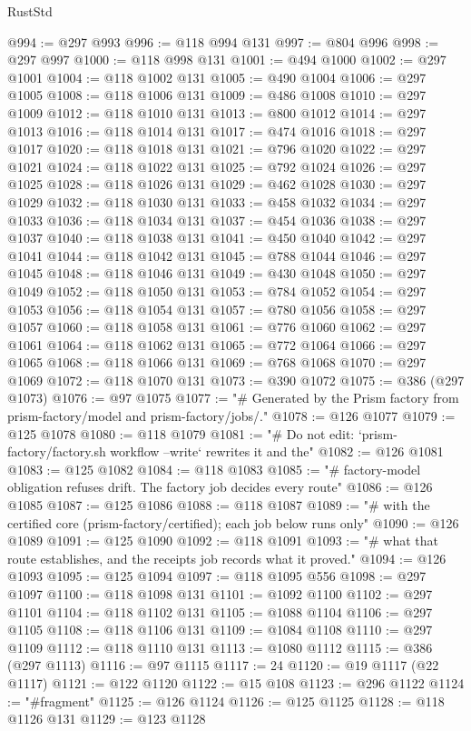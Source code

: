 \begin{lexlean}{RustStd}
\begin{coremodule}
@994 := @297 @993
@996 := @118 @994 @131
@997 := @804 @996
@998 := @297 @997
@1000 := @118 @998 @131
@1001 := @494 @1000
@1002 := @297 @1001
@1004 := @118 @1002 @131
@1005 := @490 @1004
@1006 := @297 @1005
@1008 := @118 @1006 @131
@1009 := @486 @1008
@1010 := @297 @1009
@1012 := @118 @1010 @131
@1013 := @800 @1012
@1014 := @297 @1013
@1016 := @118 @1014 @131
@1017 := @474 @1016
@1018 := @297 @1017
@1020 := @118 @1018 @131
@1021 := @796 @1020
@1022 := @297 @1021
@1024 := @118 @1022 @131
@1025 := @792 @1024
@1026 := @297 @1025
@1028 := @118 @1026 @131
@1029 := @462 @1028
@1030 := @297 @1029
@1032 := @118 @1030 @131
@1033 := @458 @1032
@1034 := @297 @1033
@1036 := @118 @1034 @131
@1037 := @454 @1036
@1038 := @297 @1037
@1040 := @118 @1038 @131
@1041 := @450 @1040
@1042 := @297 @1041
@1044 := @118 @1042 @131
@1045 := @788 @1044
@1046 := @297 @1045
@1048 := @118 @1046 @131
@1049 := @430 @1048
@1050 := @297 @1049
@1052 := @118 @1050 @131
@1053 := @784 @1052
@1054 := @297 @1053
@1056 := @118 @1054 @131
@1057 := @780 @1056
@1058 := @297 @1057
@1060 := @118 @1058 @131
@1061 := @776 @1060
@1062 := @297 @1061
@1064 := @118 @1062 @131
@1065 := @772 @1064
@1066 := @297 @1065
@1068 := @118 @1066 @131
@1069 := @768 @1068
@1070 := @297 @1069
@1072 := @118 @1070 @131
@1073 := @390 @1072
@1075 := @386 (@297 @1073)
@1076 := @97 @1075
@1077 := "# Generated by the Prism factory from prism-factory/model and prism-factory/jobs/."
@1078 := @126 @1077
@1079 := @125 @1078
@1080 := @118 @1079
@1081 := "# Do not edit: `prism-factory/factory.sh workflow --write` rewrites it and the"
@1082 := @126 @1081
@1083 := @125 @1082
@1084 := @118 @1083
@1085 := "# factory-model obligation refuses drift. The factory job decides every route"
@1086 := @126 @1085
@1087 := @125 @1086
@1088 := @118 @1087
@1089 := "# with the certified core (prism-factory/certified); each job below runs only"
@1090 := @126 @1089
@1091 := @125 @1090
@1092 := @118 @1091
@1093 := "# what that route establishes, and the receipts job records what it proved."
@1094 := @126 @1093
@1095 := @125 @1094
@1097 := @118 @1095 @556
@1098 := @297 @1097
@1100 := @118 @1098 @131
@1101 := @1092 @1100
@1102 := @297 @1101
@1104 := @118 @1102 @131
@1105 := @1088 @1104
@1106 := @297 @1105
@1108 := @118 @1106 @131
@1109 := @1084 @1108
@1110 := @297 @1109
@1112 := @118 @1110 @131
@1113 := @1080 @1112
@1115 := @386 (@297 @1113)
@1116 := @97 @1115
@1117 := 24
@1120 := @19 @1117 (@22 @1117)
@1121 := @122 @1120
@1122 := @15 @108
@1123 := @296 @1122
@1124 := "#fragment"
@1125 := @126 @1124
@1126 := @125 @1125
@1128 := @118 @1126 @131
@1129 := @123 @1128

\end{coremodule}
\end{lexlean}
